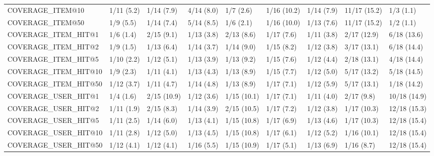 \begin{tabular}{lllllllll}
COVERAGE_ITEM@10     &     1/11 (5.2) &     1/14 (7.9) &    4/14 (8.0) &    1/7 (2.6) &  1/16 (10.2) &     1/14 (7.9) &  11/17 (15.2) &     1/3 (1.1) \\
COVERAGE_ITEM@50     &      1/9 (5.5) &     1/14 (7.4) &    5/14 (8.5) &    1/6 (2.1) &  1/16 (10.0) &     1/13 (7.6) &  11/17 (15.2) &     1/2 (1.1) \\
COVERAGE_ITEM_HIT@1  &      1/6 (1.4) &     2/15 (9.1) &    1/13 (3.8) &   2/13 (8.6) &   1/17 (7.6) &     1/11 (3.8) &   2/17 (12.9) &   6/18 (13.6) \\
COVERAGE_ITEM_HIT@2  &      1/9 (1.5) &     1/13 (6.4) &    1/14 (3.7) &   1/14 (9.0) &   1/15 (8.2) &     1/12 (3.8) &   3/17 (13.1) &   6/18 (14.4) \\
COVERAGE_ITEM_HIT@5  &     1/10 (2.2) &     1/12 (5.1) &    1/13 (3.9) &   1/13 (9.2) &   1/15 (7.6) &     1/12 (4.4) &   2/18 (13.1) &   4/18 (14.4) \\
COVERAGE_ITEM_HIT@10 &      1/9 (2.3) &     1/11 (4.1) &    1/13 (4.3) &   1/13 (8.9) &   1/15 (7.7) &     1/12 (5.0) &   5/17 (13.2) &   5/18 (14.5) \\
COVERAGE_ITEM_HIT@50 &     1/12 (3.7) &     1/11 (4.7) &    1/14 (4.8) &   1/13 (8.9) &   1/17 (7.1) &     1/12 (5.9) &   5/17 (13.1) &   1/18 (14.2) \\
COVERAGE_USER_HIT@1  &      1/4 (1.6) &    2/15 (10.9) &    1/12 (3.6) &  1/15 (10.1) &   1/17 (7.1) &     1/11 (4.0) &    2/17 (9.8) &  10/18 (14.9) \\
COVERAGE_USER_HIT@2  &     1/11 (1.9) &     2/15 (8.3) &    1/14 (3.9) &  2/15 (10.5) &   1/17 (7.2) &     1/12 (3.8) &   1/17 (10.3) &  12/18 (15.3) \\
COVERAGE_USER_HIT@5  &     1/11 (2.5) &     1/14 (6.0) &    1/13 (4.1) &  1/15 (10.8) &   1/17 (6.9) &     1/13 (4.6) &   1/17 (10.3) &  12/18 (15.4) \\
COVERAGE_USER_HIT@10 &     1/11 (2.8) &     1/12 (5.0) &    1/13 (4.5) &  1/15 (10.8) &   1/17 (6.1) &     1/12 (5.2) &   1/16 (10.1) &  12/18 (15.4) \\
COVERAGE_USER_HIT@50 &     1/12 (4.1) &     1/12 (4.1) &    1/16 (5.5) &  1/15 (10.9) &   1/17 (5.1) &     1/13 (6.9) &    1/16 (8.7) &  12/18 (15.4) \\
\bottomrule
\end{tabular}
